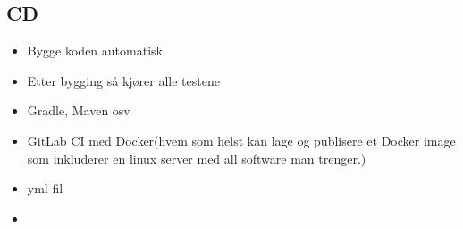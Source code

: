 \documentclass{article}
\begin{document}
\begin{flushleft}
        \section{CD}
        \begin{itemize}
            \item Bygge koden automatisk
            \item Etter bygging så kjører alle testene
            \item Gradle, Maven osv
            \item GitLab CI med Docker(hvem som helst kan lage og publisere et Docker image som inkluderer en linux server med all software man trenger.)
            \item yml fil
            \item 
        \end{itemize}

    \end{flushleft}
\end{document}
